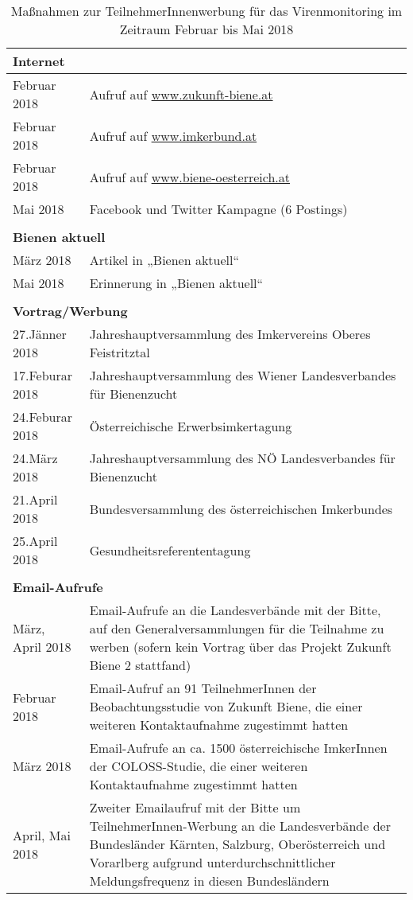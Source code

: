 
\begin{table}[htp]
    \caption{Maßnahmen zur TeilnehmerInnenwerbung für das Virenmonitoring im Zeitraum Februar bis Mai 2018}
    \centering
    \begin{tabular}{l|p{13cm}}
    \multicolumn{2}{l}{\textbf{Internet}} \\
    \midrule
    Februar 2018  & Aufruf auf \url{www.zukunft-biene.at} \\
    Februar 2018  & Aufruf auf \url{www.imkerbund.at} \\ 
    Februar 2018  & Aufruf auf \url{www.biene-oesterreich.at} \\ 
    Mai 2018      & Facebook und Twitter Kampagne (6 Postings) \\ 
    
    \multicolumn{2}{l}{\textbf{}} \\
    \multicolumn{2}{l}{\textbf{Bienen aktuell}} \\
    \midrule
    März 2018     & Artikel in „Bienen aktuell“ \\ 
    Mai 2018      & Erinnerung in „Bienen aktuell“ \\ 
    
    \multicolumn{2}{l}{\textbf{}} \\
    \multicolumn{2}{l}{\textbf{Vortrag/Werbung}} \\
    \midrule
    27.Jänner 2018    & Jahreshauptversammlung des Imkervereins Oberes Feistritztal \\
    17.Feburar 2018   & Jahreshauptversammlung des Wiener Landesverbandes für Bienenzucht \\ 
    24.Feburar 2018   & Österreichische Erwerbsimkertagung \\
    24.März 2018      & Jahreshauptversammlung des NÖ Landesverbandes für Bienenzucht \\
    21.April 2018     & Bundesversammlung des österreichischen Imkerbundes \\
    25.April 2018     & Gesundheitsreferententagung \\
    
    \multicolumn{2}{l}{\textbf{}} \\
    \multicolumn{2}{l}{\textbf{Email-Aufrufe}} \\
    \midrule
    
    März, April 2018 & Email-Aufrufe an die Landesverbände mit der Bitte, auf den Generalversammlungen für die Teilnahme zu werben (sofern kein Vortrag über das Projekt Zukunft Biene 2 stattfand) \\
    Februar 2018 & Email-Aufruf an 91 TeilnehmerInnen der Beobachtungsstudie von Zukunft Biene, die einer weiteren Kontaktaufnahme zugestimmt hatten\\
    März 2018 & Email-Aufrufe an ca. 1500 österreichische ImkerInnen der COLOSS-Studie, die einer weiteren Kontaktaufnahme zugestimmt hatten\\
    April, Mai 2018 & Zweiter Emailaufruf mit der Bitte um TeilnehmerInnen-Werbung an die Landesverbände der Bundesländer Kärnten, Salzburg, Oberösterreich und Vorarlberg aufgrund unterdurchschnittlicher Meldungsfrequenz in diesen Bundesländern \\
    
    \end{tabular}
    \label{tab:a:werbung}
\end{table}
